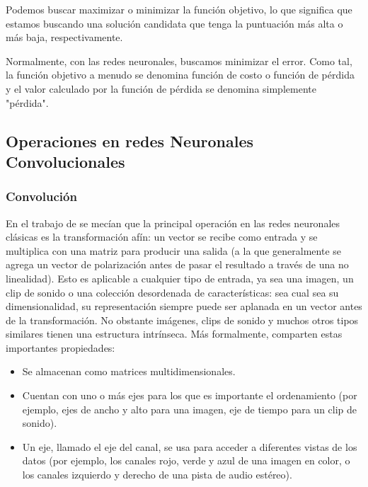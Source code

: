 Podemos buscar maximizar o minimizar la función objetivo, lo que significa que estamos buscando una solución candidata que tenga la puntuación más alta o más baja, respectivamente.

Normalmente, con las redes neuronales, buscamos minimizar el error. Como tal, la función objetivo a menudo se denomina función de costo o función de pérdida y el valor calculado por la función de pérdida se denomina simplemente "pérdida".
\subsection{Operaciones en redes Neuronales Convolucionales}
\subsubsection{Convolución }
\label{subsec:convolucion}

En el trabajo de \cite{Dumoulin2016} se mecían que la principal operación en las redes neuronales clásicas es la transformación afín: un vector se recibe como entrada y se multiplica con una matriz para producir una salida (a la que generalmente se agrega un vector de polarización antes de pasar el resultado a través de una no linealidad). Esto es aplicable a cualquier tipo de entrada, ya sea una imagen, un clip de sonido o una colección desordenada de características: sea cual sea su dimensionalidad, su representación siempre puede ser aplanada en un vector antes de la transformación. No obstante imágenes, clips de sonido y muchos otros tipos similares tienen una estructura intrínseca. Más formalmente, comparten estas importantes propiedades:
\begin{itemize}
    \item  Se almacenan como matrices multidimensionales.
\item Cuentan con uno o más ejes para los que es importante el ordenamiento (por ejemplo, ejes de ancho y alto para una imagen, eje de tiempo para un clip de sonido).
\item Un eje, llamado el eje del canal, se usa para acceder a diferentes vistas de los datos (por ejemplo, los canales rojo, verde y azul de una imagen en color, o los canales izquierdo y derecho de una pista de audio estéreo).
\end{itemize}

